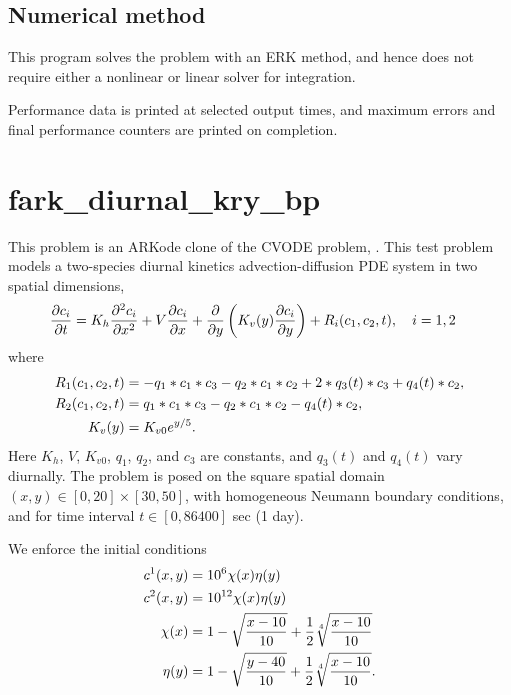 \documentclass[letterpaper,10pt,english]{sphinxmanual}
\begin{document}
\section{Numerical method}
\label{fark_diag_non_p:numerical-method}
This program solves the problem with an ERK method, and hence does not
require either a nonlinear or linear solver for integration.

Performance data is printed at selected output times, and maximum
errors and final performance counters are printed on completion.


\chapter{fark\_diurnal\_kry\_bp}
\label{fark_diurnal_kry_bp::doc}\label{fark_diurnal_kry_bp:fark-diurnal-kry-bp}\label{fark_diurnal_kry_bp:id1}
This problem is an ARKode clone of the CVODE problem,
.  This test problem models a two-species
diurnal kinetics advection-diffusion PDE system in two spatial
dimensions,
\begin{gather}
\begin{split}\frac{\partial c_i}{\partial t} &=
  K_h \frac{\partial^2 c_i}{\partial x^2} +
  V \frac{\partial     c_i}{\partial x} +
  \frac{\partial}{\partial y}\left( K_v(y)
  \frac{\partial c_i}{\partial y}\right) +
  R_i(c_1,c_2,t),\quad i=1,2\end{split}\notag
\end{gather}
where
\begin{gather}
\begin{split}R_1(c_1,c_2,t) &= -q_1*c_1*c_3 - q_2*c_1*c_2 + 2*q_3(t)*c_3 + q_4(t)*c_2, \\
R_2(c_1,c_2,t) &=  q_1*c_1*c_3 - q_2*c_1*c_2 - q_4(t)*c_2, \\
K_v(y) &= K_{v0} e^{y/5}.\end{split}\notag
\end{gather}
Here $K_h$, $V$, $K_{v0}$, $q_1$, $q_2$,
and $c_3$ are constants, and $q_3(t)$ and $q_4(t)$
vary diurnally.  The problem is posed on the square spatial domain
$(x,y) \in [0,20]\times[30,50]$, with homogeneous Neumann
boundary conditions, and for time interval $t\in [0,86400]$ sec
(1 day).

We enforce the initial conditions
\begin{gather}
\begin{split}c^1(x,y) &=  10^6 \chi(x)\eta(y) \\
c^2(x,y) &=  10^{12} \chi(x)\eta(y) \\
\chi(x) &= 1 - \sqrt{\frac{x - 10}{10}} + \frac12 \sqrt[4]{\frac{x - 10}{10}} \\
\eta(y) &= 1 - \sqrt{\frac{y - 40}{10}} + \frac12 \sqrt[4]{\frac{x - 10}{10}}.\end{split}\notag
\end{gather}
\end{document}
